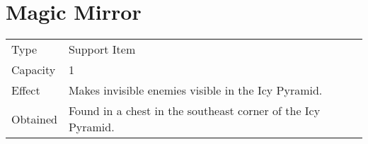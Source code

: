 \section{Magic Mirror}
\label{item:magic_mirror}


\noindent\begin{tabularx}{\textwidth}[l]{lX}
	Type
	& Support Item
\\ %
	Capacity
	& 1
\\ %
	Effect
	& Makes invisible enemies visible in the Icy Pyramid.
\\ %
	Obtained
	& Found in a chest in the southeast corner of the Icy Pyramid.
\end{tabularx}
